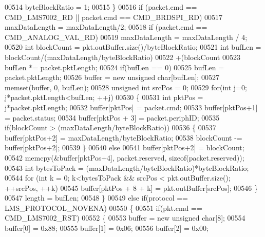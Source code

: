 \begin{DoxyCode}
{{{{{00514             byteBlockRatio = 1;
00515         \}
00516         \textcolor{keywordflow}{if} (packet.cmd == CMD_LMS7002_RD || packet.cmd == CMD_BRDSPI_RD)
00517             maxDataLength = maxDataLength/2;
00518         \textcolor{keywordflow}{if} (packet.cmd == CMD_ANALOG_VAL_RD)
00519             maxDataLength = maxDataLength / 4;
00520         \textcolor{keywordtype}{int} blockCount = pkt.outBuffer.size()/byteBlockRatio;
00521         \textcolor{keywordtype}{int} bufLen = blockCount/(maxDataLength/byteBlockRatio)
00522                     +(blockCount%
00523         bufLen *= packet.pktLength;
00524         \textcolor{keywordflow}{if}(bufLen == 0)
00525             bufLen = packet.pktLength;
00526         buffer = \textcolor{keyword}{new} \textcolor{keywordtype}{unsigned} \textcolor{keywordtype}{char}[bufLen];
00527         memset(buffer, 0, bufLen);
00528         \textcolor{keywordtype}{unsigned} \textcolor{keywordtype}{int} srcPos = 0;
00529         \textcolor{keywordflow}{for}(\textcolor{keywordtype}{int} j=0; j*packet.pktLength<bufLen; ++j)
00530         \{
00531             \textcolor{keywordtype}{int} pktPos = j*packet.pktLength;
00532             buffer[pktPos] = packet.cmd;
00533             buffer[pktPos+1] = packet.status;
00534             buffer[pktPos + 3] = packet.periphID;
00535             \textcolor{keywordflow}{if}(blockCount > (maxDataLength/byteBlockRatio))
00536             \{
00537                 buffer[pktPos+2] = maxDataLength/byteBlockRatio;
00538                 blockCount -= buffer[pktPos+2];
00539             \}
00540             \textcolor{keywordflow}{else}
00541                 buffer[pktPos+2] = blockCount;
00542             memcpy(&buffer[pktPos+4], packet.reserved, \textcolor{keyword}{sizeof}(packet.reserved));
00543             \textcolor{keywordtype}{int} bytesToPack = (maxDataLength/byteBlockRatio)*byteBlockRatio;
00544             \textcolor{keywordflow}{for} (\textcolor{keywordtype}{int} k = 0; k<bytesToPack && srcPos < pkt.outBuffer.size(); ++srcPos, ++k)
00545                 buffer[pktPos + 8 + k] = pkt.outBuffer[srcPos];
00546         \}
00547         length = bufLen;
00548     \}
00549     \textcolor{keywordflow}{else} \textcolor{keywordflow}{if}(protocol == LMS_PROTOCOL_NOVENA)
00550     \{
00551         \textcolor{keywordflow}{if}(pkt.cmd == CMD_LMS7002_RST)
00552         \{
00553             buffer = \textcolor{keyword}{new} \textcolor{keywordtype}{unsigned} \textcolor{keywordtype}{char}[8];
00554             buffer[0] = 0x88;
00555             buffer[1] = 0x06;
00556             buffer[2] = 0x00;
}}}}}
\end{DoxyCode}
